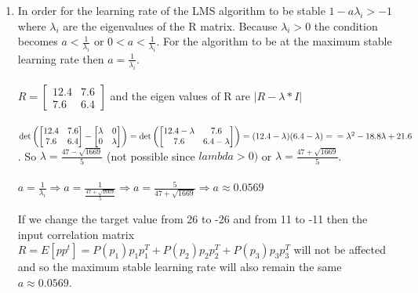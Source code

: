 \documentclass{article}
\begin{document}
\begin{enumerate}[label=\Alph*]
    
  \item In order for the learning rate of the LMS algorithm to be stable ${1-a\lambda_i > -1}$ where ${\lambda_i}$ are the eigenvalues of the R matrix. Because ${\lambda_i > 0}$ the condition becomes
  ${a < \frac{1}{\lambda_i}}$ or ${0 < a < \frac{1}{\lambda_i}}$. For the algorithm to be at the maximum stable learning rate then ${a = \frac{1}{\lambda_i}}$. 
  \\ \\ $R = \begin{bmatrix}
    12.4 & 7.6 \\
    7.6 & 6.4
  \end{bmatrix} $
  and the eigen values of R are ${|R - \lambda*I|}$ \\
  \\$\det \left ( \begin{bmatrix}
    12.4 & 7.6 \\
    7.6 & 6.4
  \end{bmatrix} 
  -\begin{bmatrix}
    \lambda & 0 \\
    0 & \lambda
  \end{bmatrix} \right )  = 
  \det \left (\begin{bmatrix}
    12.4-\lambda & 7.6 \\
    7.6 & 6.4-\lambda
\end{bmatrix} \right ) = (12.4-\lambda)(6.4-\lambda) = \\ \\ =\lambda^2 - 18.8\lambda + 21.6$
. So ${\lambda = \frac{47 - \sqrt{1669} }{5}}$ (not possible since ${lambda > 0})$ or ${\lambda = \frac{47 + \sqrt{1669} }{5}}$.
\\ \\ ${a = \frac{1}{\lambda_i} \Rightarrow a= \frac{1}{\frac{47 + \sqrt{1669} }{5}}} \Rightarrow a = \frac{5}{47+\sqrt{1669}} \Rightarrow a \approx 0.0569 $

If we change the target value from 26 to -26 and from 11 to -11 then the input correlation matrix 
$R = E[pp^t] = P(p_1)p_1p_1^T + P(p_2)p_2p_2^T + P(p_3)p_3p_3^T$ will not be affected and so the maximum stable learning rate will also remain the same ${a \approx 0.0569}$.


\end{enumerate}
\end{document}

